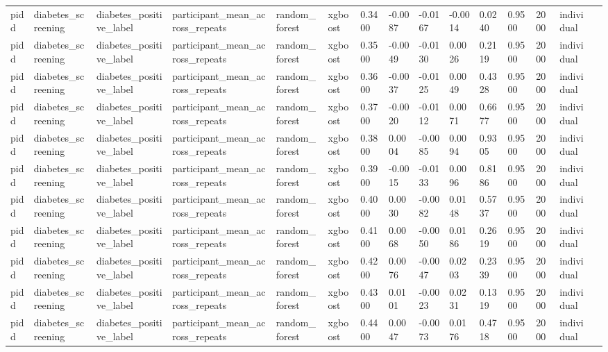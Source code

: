 \begin{tabular}{lllllllllllllll}
pidd & diabetes\_screening & diabetes\_positive\_label & participant\_mean\_across\_repeats & random\_forest & xgboost & 0.3400 & -0.0087 & -0.0167 & -0.0014 & 0.0240 & 0.9500 & 2000 & individual &  \\
pidd & diabetes\_screening & diabetes\_positive\_label & participant\_mean\_across\_repeats & random\_forest & xgboost & 0.3500 & -0.0049 & -0.0130 & 0.0026 & 0.2119 & 0.9500 & 2000 & individual &  \\
pidd & diabetes\_screening & diabetes\_positive\_label & participant\_mean\_across\_repeats & random\_forest & xgboost & 0.3600 & -0.0037 & -0.0125 & 0.0049 & 0.4328 & 0.9500 & 2000 & individual &  \\
pidd & diabetes\_screening & diabetes\_positive\_label & participant\_mean\_across\_repeats & random\_forest & xgboost & 0.3700 & -0.0020 & -0.0112 & 0.0071 & 0.6677 & 0.9500 & 2000 & individual &  \\
pidd & diabetes\_screening & diabetes\_positive\_label & participant\_mean\_across\_repeats & random\_forest & xgboost & 0.3800 & 0.0004 & -0.0085 & 0.0094 & 0.9305 & 0.9500 & 2000 & individual &  \\
pidd & diabetes\_screening & diabetes\_positive\_label & participant\_mean\_across\_repeats & random\_forest & xgboost & 0.3900 & -0.0015 & -0.0133 & 0.0096 & 0.8186 & 0.9500 & 2000 & individual &  \\
pidd & diabetes\_screening & diabetes\_positive\_label & participant\_mean\_across\_repeats & random\_forest & xgboost & 0.4000 & 0.0030 & -0.0082 & 0.0148 & 0.5737 & 0.9500 & 2000 & individual &  \\
pidd & diabetes\_screening & diabetes\_positive\_label & participant\_mean\_across\_repeats & random\_forest & xgboost & 0.4100 & 0.0068 & -0.0050 & 0.0186 & 0.2619 & 0.9500 & 2000 & individual &  \\
pidd & diabetes\_screening & diabetes\_positive\_label & participant\_mean\_across\_repeats & random\_forest & xgboost & 0.4200 & 0.0076 & -0.0047 & 0.0203 & 0.2339 & 0.9500 & 2000 & individual &  \\
pidd & diabetes\_screening & diabetes\_positive\_label & participant\_mean\_across\_repeats & random\_forest & xgboost & 0.4300 & 0.0101 & -0.0023 & 0.0231 & 0.1319 & 0.9500 & 2000 & individual &  \\
pidd & diabetes\_screening & diabetes\_positive\_label & participant\_mean\_across\_repeats & random\_forest & xgboost & 0.4400 & 0.0047 & -0.0073 & 0.0176 & 0.4718 & 0.9500 & 2000 & individual &  \\

\end{tabular}
